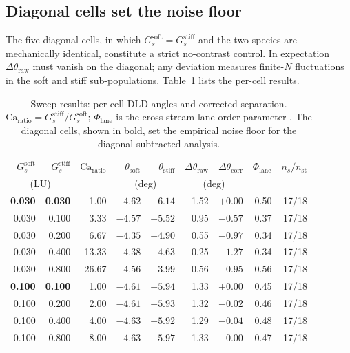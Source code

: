 \documentclass[11pt,a4paper]{article}
\begin{document}
\subsection{Diagonal cells set the noise floor}
\label{sec:results-diagonal}

The five diagonal cells, in which $G_s^{\text{soft}} =
G_s^{\text{stiff}}$ and the two species are mechanically identical,
constitute a strict no-contrast control. In expectation
$\Delta\theta_{\text{raw}}$ must vanish on the diagonal; any
deviation measures finite-$N$ fluctuations in the soft and stiff
sub-populations. Table~\ref{tab:cells} lists the per-cell results.

\begin{table}[t]
\centering
\caption{Sweep results: per-cell DLD angles and corrected separation.
$\mathrm{Ca}_{\text{ratio}} = G_s^{\text{stiff}} / G_s^{\text{soft}}$;
$\Phi_{\text{lane}}$ is the cross-stream lane-order parameter
\citep{forterre2008flows}. The diagonal cells, shown in bold, set the
empirical noise floor for the diagonal-subtracted analysis.}
\label{tab:cells}
\small
\begin{tabular}{rrr rrr rr r}
\toprule
$G_s^{\text{soft}}$ & $G_s^{\text{stiff}}$ & $\mathrm{Ca}_{\text{ratio}}$
 & $\theta_{\text{soft}}$ & $\theta_{\text{stiff}}$
 & $\Delta\theta_{\text{raw}}$ & $\Delta\theta_{\text{corr}}$
 & $\Phi_{\text{lane}}$ & $n_s/n_{\text{st}}$ \\
 \multicolumn{2}{c}{(LU)} & & \multicolumn{2}{c}{(deg)}
 & \multicolumn{2}{c}{(deg)} & & \\
\midrule
\textbf{0.030} & \textbf{0.030} &  1.00 & $-4.62$ & $-6.14$ & 1.52 & $+0.00$ & 0.50 & 17/18 \\
0.030 & 0.100 &  3.33 & $-4.57$ & $-5.52$ & 0.95 & $-0.57$ & 0.37 & 17/18 \\
0.030 & 0.200 &  6.67 & $-4.35$ & $-4.90$ & 0.55 & $-0.97$ & 0.34 & 17/18 \\
0.030 & 0.400 & 13.33 & $-4.38$ & $-4.63$ & 0.25 & $-1.27$ & 0.34 & 17/18 \\
0.030 & 0.800 & 26.67 & $-4.56$ & $-3.99$ & 0.56 & $-0.95$ & 0.56 & 17/18 \\
\textbf{0.100} & \textbf{0.100} &  1.00 & $-4.61$ & $-5.94$ & 1.33 & $+0.00$ & 0.45 & 17/18 \\
0.100 & 0.200 &  2.00 & $-4.61$ & $-5.93$ & 1.32 & $-0.02$ & 0.46 & 17/18 \\
0.100 & 0.400 &  4.00 & $-4.63$ & $-5.92$ & 1.29 & $-0.04$ & 0.48 & 17/18 \\
0.100 & 0.800 &  8.00 & $-4.63$ & $-5.97$ & 1.33 & $-0.00$ & 0.47 & 17/18 \\

\end{tabular}
\end{table}
\end{document}

